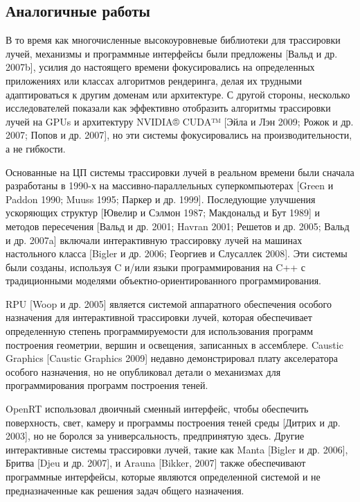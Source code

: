 \subsection{Аналогичные работы}
В то время как многочисленные высокоуровневые библиотеки для трассировки лучей, механизмы и программные интерфейсы были предложены [Вальд и др. 2007b], усилия до настоящего времени фокусировались на определенных приложениях или классах алгоритмов рендеринга, делая их трудными адаптироваться к другим доменам или архитектуре.
С другой стороны, несколько исследователей показали как  эффективно отобразить алгоритмы трассировки лучей на GPUs и архитектуру NVIDIA® CUDA™ [Эйла и Лэн 2009; Рожок и др. 2007; Попов и др. 2007], но эти системы фокусировались на производительности, а не гибкости.

Основанные на ЦП системы трассировки лучей в реальном времени были сначала разработаны в 1990-х на массивно-параллельных суперкомпьютерах [Green и Paddon 1990; Muuss 1995; Паркер и др. 1999]. 
Последующие улучшения ускоряющих структур [Ювелир и Сэлмон 1987; Макдональд и Бут 1989] и методов пересечения [Вальд и др. 2001; Havran 2001; Решетов и др. 2005; Вальд и др. 2007a] включали интерактивную трассировку лучей на машинах настольного класса [Bigler и др. 2006; Георгиев и Слусаллек 2008]. 
Эти системы были созданы, используя C и/или языки программирования на C++ с традиционными моделями объектно-ориентированного программирования.
  
RPU [Woop и др. 2005] является системой аппаратного обеспечения особого назначения для интерактивной трассировки лучей, которая обеспечивает определенную степень программируемости для использования программ построения геометрии, вершин и освещения, записанных в ассемблере. Caustic Graphics [Caustic Graphics 2009] недавно демонстрировал плату акселератора особого назначения, но не опубликовал детали о механизмах для программирования программ построения теней.
  
OpenRT использовал двоичный сменный интерфейс, чтобы обеспечить поверхность, свет, камеру и программы построения теней среды [Дитрих и др. 2003], но не боролся за универсальность, предпринятую здесь. 
Другие интерактивные системы трассировки лучей, такие как Manta [Bigler и др. 2006], Бритва [Djeu и др. 2007], и Arauna [Bikker, 2007] также обеспечивают программные интерфейсы, которые являются определенной системой и не предназначенные как решения задач общего назначения.

